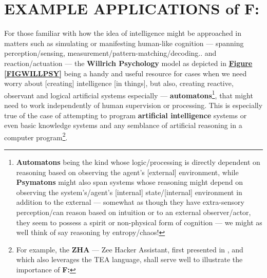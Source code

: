\documentclass[a4paper, 18pt]{book} %
\begin{document}
\section{EXAMPLE APPLICATIONS of F:}
\label{SECEXAMPF}

  
For those familiar with how the idea of intelligence might be approached in matters such as simulating or manifesting human-like cognition --- spanning perception/sensing, measurement/pattern-matching/decoding.. and reaction/actuation --- the \textbf{Willrich Psychology} model\cite{Lutalo2025transpsy} as depicted in \textbf{\hyperref[FIGWILLPSY]{Figure \ref{FIGWILLPSY}}} being a handy and useful resource for cases when we need worry about [creating] intelligence [in things], but also, creating reactive, observant and logical artificial systems especially --- \textbf{automatons}\footnote{\textbf{Automatons} being the kind whose logic/processing is directly dependent on reasoning based on observing the agent's [external] environment, while \textbf{Psymatons}\cite{lutalo2025unraveling} might also span systems whose reasoning might depend on observing the system's/agent's [internal] state/[internal] environment in addition to the external --- somewhat as though they have extra-sensory perception/can reason based on intuition or to an external observer/actor, they seem to possess a spirit or non-physical form of cognition --- we might as well think of say reasoning by entropy/chaos!}, that might need to work independently of human supervision or processing. This is especially true of the case of attempting to program \textbf{artificial intelligence} systems or even basic knowledge systems and any semblance of artificial reasoning in a computer program\footnote{For example, the \textbf{ZHA} --- Zee Hacker Assistant, first presented in \cite{jwlzha}, and which also leverages the TEA language, shall serve well to illustrate the importance of \textbf{F:}}.
\end{document}
